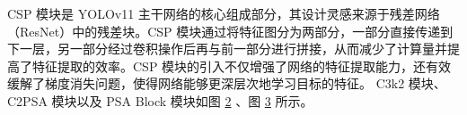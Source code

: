 \begin{figure}[htb]
    \centering
    \captionsetup{font=footnotesize}
    \label{fig:bottleneck}
\end{figure}

CSP 模块是 YOLOv11 主干网络的核心组成部分，其设计灵感来源于残差网络（ResNet）中的残差块。CSP 模块通过将特征图分为两部分，一部分直接传递到下一层，另一部分经过卷积操作后再与前一部分进行拼接，从而减少了计算量并提高了特征提取的效率。CSP 模块的引入不仅增强了网络的特征提取能力，还有效缓解了梯度消失问题，使得网络能够更深层次地学习目标的特征。
C3k2 模块、C2PSA 模块以及 PSA Block 模块如图 \ref{fig:c3k2} 、图 \ref{fig:psablock} 所示。
\begin{figure}[htb]
    \centering
    \captionsetup{font=footnotesize}
    \label{fig:c3k2}
\end{figure}

\begin{figure}[htb]
    \centering
    \captionsetup{font=footnotesize}
    \label{fig:psablock}
\end{figure}


